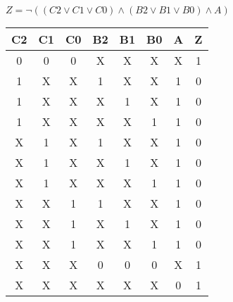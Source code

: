 \begin{center}
    {\(Z = \lnot ((C2 \lor C1 \lor C0) \land (B2 \lor B1 \lor B0) \land A) \)}
    \begin{table}[h] %
        \begin{center}
            \begin{tabular}{|c|c|c|c|c|c|c||c|} \hline
            C2 & C1 & C0 & B2 & B1 & B0 & A & Z \\ \hline\hline
            0  & 0  & 0  & X  & X  & X  & X & 1 \\ \hline
            1  & X  & X  & 1  & X  & X  & 1 & 0 \\ \hline
            1  & X  & X  & X  & 1  & X  & 1 & 0 \\ \hline
            1  & X  & X  & X  & X  & 1  & 1 & 0 \\ \hline
            X  & 1  & X  & 1  & X  & X  & 1 & 0 \\ \hline
            X  & 1  & X  & X  & 1  & X  & 1 & 0 \\ \hline
            X  & 1  & X  & X  & X  & 1  & 1 & 0 \\ \hline
            X  & X  & 1  & 1  & X  & X  & 1 & 0 \\ \hline
            X  & X  & 1  & X  & 1  & X  & 1 & 0 \\ \hline
            X  & X  & 1  & X  & X  & 1  & 1 & 0 \\ \hline
            X  & X  & X  & 0  & 0  & 0  & X & 1 \\ \hline
            X  & X  & X  & X  & X  & X  & 0 & 1 \\ \hline
            \end{tabular}
        \end{center}
    \end{table}
\end{center}
